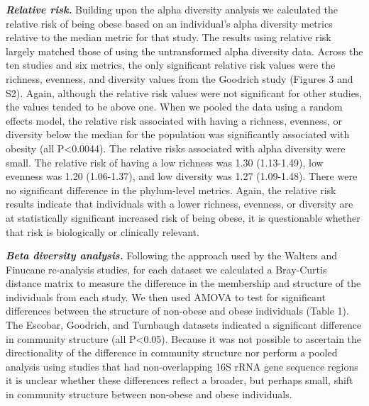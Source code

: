 \documentclass[12pt,]{article}
\begin{document}
\textbf{\emph{Relative risk.}} Building upon the alpha diversity
analysis we calculated the relative risk of being obese based on an
individual's alpha diversity metrics relative to the median metric for
that study. The results using relative risk largely matched those of
using the untransformed alpha diversity data. Across the ten studies and
six metrics, the only significant relative risk values were the
richness, evenness, and diversity values from the Goodrich study
(Figures 3 and S2). Again, although the relative risk values were not
significant for other studies, the values tended to be above one. When
we pooled the data using a random effects model, the relative risk
associated with having a richness, evenness, or diversity below the
median for the population was significantly associated with obesity (all
P\textless{}0.0044). The relative risks associated with alpha diversity
were small. The relative risk of having a low richness was 1.30
(1.13-1.49), low evenness was 1.20 (1.06-1.37), and low diversity was
1.27 (1.09-1.48). There were no significant difference in the
phylum-level metrics. Again, the relative risk results indicate that
individuals with a lower richness, evenness, or diversity are at
statistically significant increased risk of being obese, it is
questionable whether that risk is biologically or clinically relevant.

\textbf{\emph{Beta diversity analysis.}} Following the approach used by
the Walters and Finucane re-analysis studies, for each dataset we
calculated a Bray-Curtis distance matrix to measure the difference in
the membership and structure of the individuals from each study. We then
used AMOVA to test for significant differences between the structure of
non-obese and obese individuals (Table 1). The Escobar, Goodrich, and
Turnbaugh datasets indicated a significant difference in community
structure (all P\textless{}0.05). Because it was not possible to
ascertain the directionality of the difference in community structure
nor perform a pooled analysis using studies that had non-overlapping 16S
rRNA gene sequence regions it is unclear whether these differences
reflect a broader, but perhaps small, shift in community structure
between non-obese and obese individuals.
\end{document}
